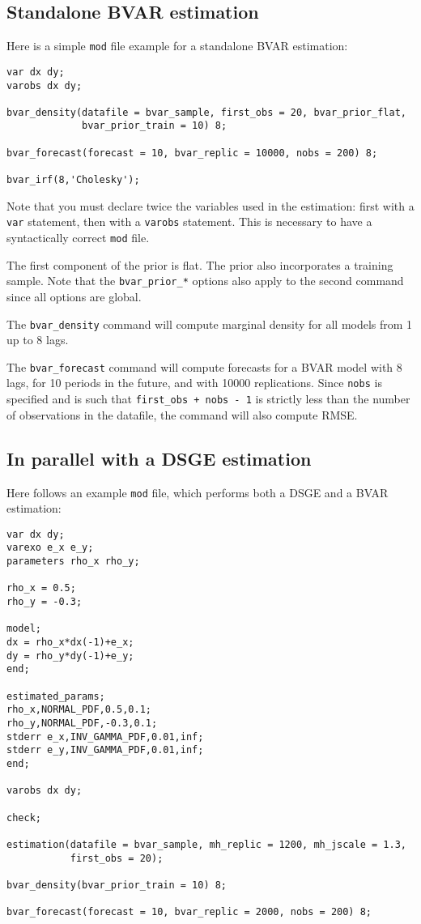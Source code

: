 \documentclass[11pt,a4paper]{article}
\begin{document}
\subsection{Standalone BVAR estimation}

Here is a simple \texttt{mod} file example for a standalone BVAR estimation:

\begin{verbatim}
var dx dy;
varobs dx dy;

bvar_density(datafile = bvar_sample, first_obs = 20, bvar_prior_flat,
             bvar_prior_train = 10) 8;

bvar_forecast(forecast = 10, bvar_replic = 10000, nobs = 200) 8;

bvar_irf(8,'Cholesky');
\end{verbatim}

Note that you must declare twice the variables used in the estimation: first with a \texttt{var} statement, then with a \texttt{varobs} statement. This is necessary to have a syntactically correct \texttt{mod} file.

The first component of the prior is flat. The prior also incorporates a training sample. Note that the \texttt{bvar\_prior\_*} options also apply to the second command since all options are global.

The \texttt{bvar\_density} command will compute marginal density for all models from 1 up to 8 lags.

The \texttt{bvar\_forecast} command will compute forecasts for a BVAR model with 8 lags, for 10 periods in the future, and with 10000 replications. Since \texttt{nobs} is specified and is such that \texttt{first\_obs + nobs - 1} is strictly less than the number of observations in the datafile, the command will also compute RMSE.

\subsection{In parallel with a DSGE estimation}

Here follows an example \texttt{mod} file, which performs both a DSGE and a BVAR estimation:

\begin{verbatim}
var dx dy;
varexo e_x e_y;
parameters rho_x rho_y;

rho_x = 0.5;
rho_y = -0.3;

model;
dx = rho_x*dx(-1)+e_x;
dy = rho_y*dy(-1)+e_y;
end;

estimated_params;
rho_x,NORMAL_PDF,0.5,0.1;
rho_y,NORMAL_PDF,-0.3,0.1;
stderr e_x,INV_GAMMA_PDF,0.01,inf;
stderr e_y,INV_GAMMA_PDF,0.01,inf;
end;

varobs dx dy;

check;

estimation(datafile = bvar_sample, mh_replic = 1200, mh_jscale = 1.3,
           first_obs = 20);

bvar_density(bvar_prior_train = 10) 8;

bvar_forecast(forecast = 10, bvar_replic = 2000, nobs = 200) 8;
\end{verbatim}
\end{document}
